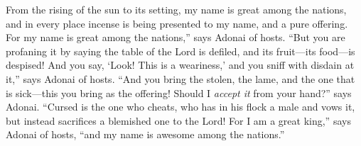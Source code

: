 \begin{biblechapter}
\verse From the rising of the sun to its setting, my name is great among the nations, and in every place incense is being presented to my name, and a pure offering. For my name is great among the nations,” says Adonai of hosts.
\verse “But you are profaning it by saying the table of the Lord is defiled, and its fruit—its food—is despised!
\verse And you say, ‘Look! This is a weariness,’ and you sniff with disdain at it,” says Adonai of hosts. “And you bring the stolen, the lame, and the one that is sick—this you bring as the offering! Should I \textit{accept it} from your hand?” says Adonai.
\verse “Cursed is the one who cheats, who has in his flock a male and vows it, but instead sacrifices a blemished one to the Lord! For I am a great king,” says Adonai of hosts, “and my name is awesome among the nations.”
\end{biblechapter}

